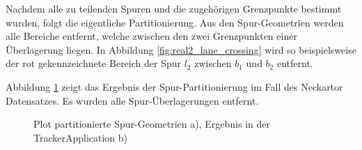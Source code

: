 Nachdem alle zu teilenden Spuren und die zugehörigen Grenzpunkte
bestimmt wurden, folgt die eigentliche Partitionierung. Aus den Spur-Geometrien werden alle Bereiche
entfernt, welche zwischen den zwei Grenzpunkten einer Überlagerung liegen. In Abbildung \ref{fig:real2_lane_crossing}
wird so beispielsweise der rot gekennzeichnete Bereich der Spur $l_2$ zwischen $b_1$ und $b_2$ entfernt.

Abbildung \ref{fig:real2_results_partitioning} zeigt das Ergebnis der Spur-Partitionierung im Fall des
Neckartor Datensatzes. Es wurden alle Spur-Überlagerungen entfernt.

\begin{figure}[H]
    \centering
    \qquad
    \caption{Plot partitionierte Spur-Geometrien a), Ergebnis in der TrackerApplication b)}
    \label{fig:real2_results_partitioning}
\end{figure}


